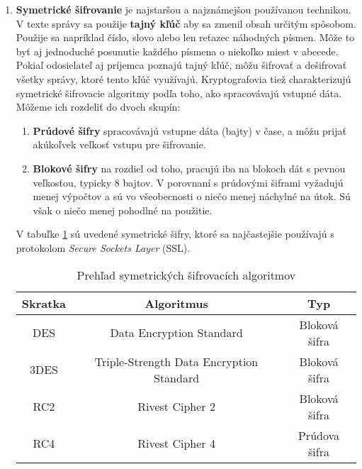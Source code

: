 \begin{enumerate}

\item \textbf{Symetrické šifrovanie} je najstaršou a najznámejšou používanou technikou. V texte správy sa použije \textbf{tajný kľúč} aby sa zmenil obsah určitým spôsobom. Použije sa napríklad číslo, slovo alebo len reťazec náhodných písmen. Môže to byť aj jednoduché posunutie každého písmena o niekoľko miest v abecede. Pokiaľ odosielateľ aj príjemca poznajú tajný kľúč, môžu šifrovať a dešifrovať všetky správy, ktoré tento kľúč využívajú. Kryptografovia tiež charakterizujú symetrické šifrovacie algoritmy podľa toho, ako spracovávajú vstupné dáta. Môžeme ich rozdeliť do dvoch skupín:

\begin{enumerate}

\item \textbf{Prúdové šifry} spracovávajú vstupne dáta (bajty) v čase, a môžu prijať akú\-koľvek veľkosť vstupu pre šifrovanie.

\item \textbf{Blokové šifry} na rozdiel od toho, pracujú iba na blokoch dát s pevnou veľkosťou, typicky 8 bajtov. V porovnaní s prúdovými šiframi vyžadujú menej výpočtov a sú vo všeobecnosti o niečo menej náchylné na útok. Sú však o niečo menej pohodlné na použitie.

\end{enumerate}

V tabuľke \ref{symetricke-sifry} sú uvedené symetrické šifry, ktoré sa najčastejšie používajú s protokolom \emph{Secure Sockets Layer} (SSL).

\begin{table}[h]
  \caption{Prehľad symetrických šifrovacích algoritmov}
  \label{symetricke-sifry}
  \begin{center}
  	\small
	  \begin{tabular}{|c|c|c|}
	    \hline
	    Skratka    						& Algoritmus 					& Typ 						  \\
	    \hline\hline
	    DES	& Data Encryption Standard 	& Bloková šifra \\
	    \hline
	    3DES 		& Triple-Strength Data Encryption Standard 	& Bloková šifra \\
	    \hline
	    RC2 		& Rivest Cipher 2 & Bloková šifra  \\
	    \hline
	    RC4 	& Rivest Cipher 4 & Prúdova šifra  \\
	    
	    \hline
	  \end{tabular}
  \end{center}
\end{table}


\end{enumerate}
